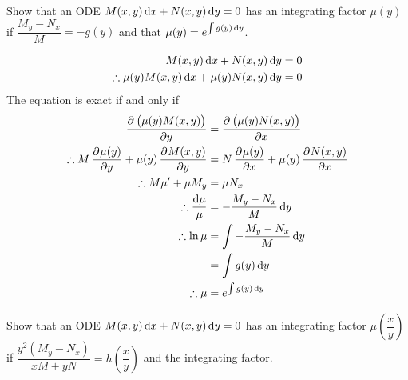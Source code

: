 \documentclass[fleqn, a4paper, 12pt, oneside]{amsart}
\theoremstyle{definition}
\theoremstyle{theorem}
\begin{document}
\begin{question}
	Show that an ODE $M(x,y) \dif x + N(x,y) \dif y = 0$ has an integrating factor $\mu(y)$ if $\dfrac{M_y - N_x}{M} = -g(y)$ and that $\mu(y) = e^{\int g(y) \dif y}$.
\end{question}

\begin{solution}
	\begin{align*}
		M(x,y) \dif x + N(x,y) \dif y &= 0\\
		\therefore \mu(y) M(x,y) \dif x + \mu(y) N(x,y) \dif y &= 0
	\end{align*}
	The equation is exact if and only if
	\begin{align*}
		\dpd{\left( \mu(y) M(x,y) \right)}{y} &= \dpd{\left( \mu(y) N(x,y) \right)}{x}\\
		\therefore M \dpd{\mu(y)}{y} + \mu(y) \dpd{M(x,y)}{y} &= N \dpd{\mu(y)}{x} + \mu(y) \dpd{N(x,y)}{x}\\
		\therefore M \mu' + \mu M_y &= \mu N_x\\
		\therefore \dfrac{\dif \mu}{\mu} &= -\dfrac{M_y - N_x}{M} \dif y\\
		\therefore \ln \mu &= \int -\dfrac{M_y - N_x}{M} \dif y\\
		&= \int g(y) \dif y\\
		\therefore \mu &= e^{\int g(y) \dif y}
	\end{align*}
\end{solution}

\begin{question}
	Show that an ODE $M(x,y) \dif x + N(x,y) \dif y = 0$ has an integrating factor $\mu \left( \dfrac{x}{y} \right)$ if $\dfrac{y^2 \left( M_y - N_x \right)}{xM + yN} = h \left( \dfrac{x}{y} \right)$ and the integrating factor.
\end{question}
\end{document}
